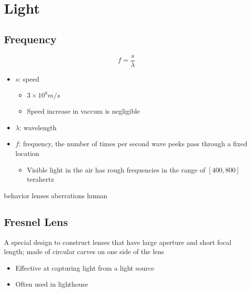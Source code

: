 \chapter{Light}

\section{Frequency}

  \begin{equation}
    f = \frac{s}{\lambda}
  \end{equation}

  \begin{itemize}
    \item $ s $: speed
    \begin{itemize}
      \item $ 3 \times 10^{8} m/s $
      \item Speed increase in vaccum is negligible
    \end{itemize}

    \item $ \lambda $: wavelength
    \item $ f $: frequency, the number of times per second wave peeks pass
    through a fixed location
    \begin{itemize}
      \item Visible light in the air has rough frequencies in the range of
      $ \left[ 400, 800 \right] $ terahertz
    \end{itemize}
  \end{itemize}

{behavior}
{lenses}
{aberrations}
{human}

\section{Fresnel Lens}

  A special design to construct lenses that have large aperture and short
  focal length; made of circular carves on one side of the lens

  \begin{itemize}
    \item Effective at capturing light from a light source
    \item Often used in lighthouse
  \end{itemize}
